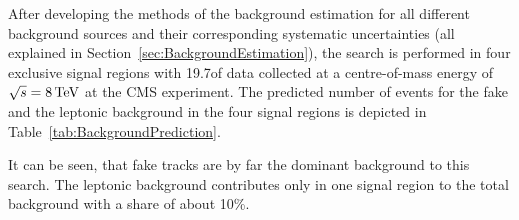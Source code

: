 After developing the methods of the background estimation for all different background sources and their corresponding systematic uncertainties (all explained in Section~\ref{sec:BackgroundEstimation}), 
the search is performed in four exclusive signal regions with 19.7\fbinv of data collected at a centre-of-mass energy of $\sqrt{s} = 8\,\text{Te}\kern-0.06667em\text{V}$ at the CMS experiment.
The predicted number of events for the fake and the leptonic background in the four signal regions is depicted in Table~\ref{tab:BackgroundPrediction}.
\renewcommand{\arraystretch}{1.5}
\begin{table}[!h]
\centering
\caption{Background prediction in the four exclusive signal regions for the fake and the leptonic background.}
\label{tab:BackgroundPrediction}
\end{table}
It can be seen, that fake tracks are by far the dominant background to this search.
The leptonic background contributes only in one signal region to the total background with a share of about 10\%.

